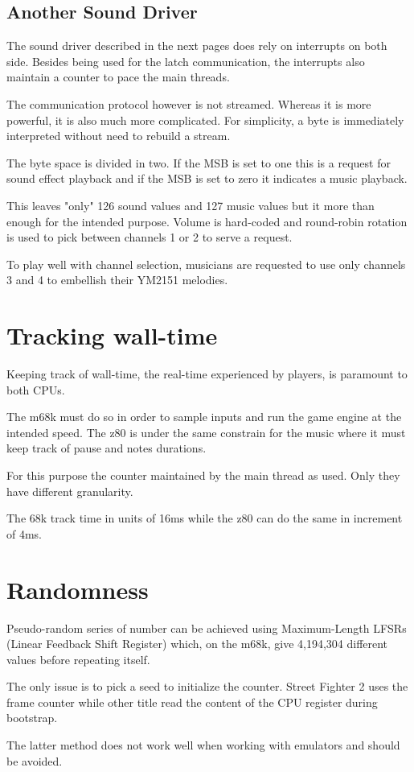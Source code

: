 \subsection{Another Sound Driver}

The sound driver described in the next pages does rely on interrupts on both side. Besides being used for the latch communication, the interrupts also maintain a counter to pace the main threads.


The communication protocol however is not streamed. Whereas it is more powerful, it is also much more complicated. For simplicity, a byte is immediately interpreted without need to rebuild a stream.

The byte space is divided in two. If the MSB is set to one  this is a request for sound effect playback and if the MSB is set to zero  it indicates a music playback. 

This leaves "only" 126 sound values and 127 music values but it more than enough for the intended purpose. Volume is hard-coded and round-robin rotation is used to pick between channels 1 or 2 to serve a request. 

To play well with channel selection, musicians are requested to use only channels 3 and 4 to embellish their YM2151 melodies. 


\section{Tracking wall-time}
Keeping track of wall-time, the real-time experienced by players, is paramount to both CPUs. 

The m68k must do so in order to sample inputs and run the game engine at the intended speed. The z80 is under the same constrain for the music where it must keep track of pause and notes durations. 

For this purpose the counter maintained by the main thread as used. Only they have different granularity.

The 68k track time in units of 16ms while the z80 can do the same in increment of 4ms.


\section{Randomness}
Pseudo-random series of number can be achieved using Maximum-Length LFSRs (Linear Feedback Shift Register) which, on the m68k, give 4,194,304 different values before repeating itself.

The only issue is to pick a seed to initialize the counter. Street Fighter 2 uses the frame counter while other title read the content of the CPU register during bootstrap.

The latter method does not work well when working with emulators and should be avoided.
